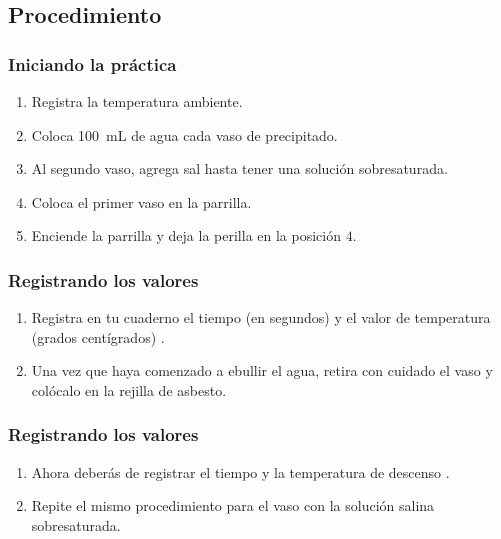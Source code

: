 \documentclass[14pt]{beamer}
\begin{document}
\subsection{Procedimiento}

\begin{frame}
\frametitle{Iniciando la práctica}
\begin{enumerate}[<+->]
\item Registra la temperatura ambiente.
\item Coloca \SI{100}{\milli\liter} de agua cada vaso de precipitado.
\item Al segundo vaso, agrega sal hasta tener una solución sobresaturada.
\item Coloca el primer vaso en la parrilla.
\item Enciende la parrilla y deja la perilla en la posición $4$.
\seti
\end{enumerate}
\end{frame}
\begin{frame}
\frametitle{Registrando los valores}
\begin{enumerate}[<+->]
\conti
\item Registra en tu cuaderno el tiempo (en segundos) y el valor de temperatura (grados centígrados) .
\item Una vez que haya comenzado a ebullir el agua, retira con cuidado el vaso y colócalo en la rejilla de asbesto.
\seti
\end{enumerate}
\end{frame}
\begin{frame}
\frametitle{Registrando los valores}
\begin{enumerate}[<+->]
\conti
\item Ahora deberás de registrar el tiempo y la temperatura de descenso .
\item Repite el mismo procedimiento para el vaso con la solución salina sobresaturada.
\end{enumerate}
\end{frame}
\end{document}
